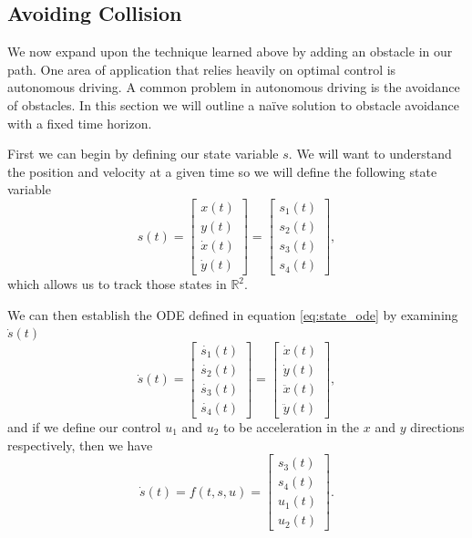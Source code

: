 \subsection*{Avoiding Collision}
We now expand upon the technique learned above by adding an obstacle in our path.
One area of application that relies heavily on optimal control is autonomous driving.
A common problem in autonomous driving is the avoidance of obstacles.
In this section we will outline a naïve solution to obstacle avoidance with a fixed time horizon.

First we can begin by defining our state variable $s$.
We will want to understand the position and velocity at a given time so we will define the following state variable
\begin{equation}\label{eq:ex-state}
    s(t) = \begin{bmatrix} x(t) \\ y(t) \\ \dot{x}(t) \\ \dot{y}(t) \end{bmatrix} = \begin{bmatrix} s_1(t) \\ s_2(t) \\ s_3(t) \\ s_4(t) \end{bmatrix},
\end{equation}
which allows us to track those states in $\mathbb{R}^2$.

We can then establish the ODE defined in equation \ref{eq:state_ode} by examining $\dot{s}(t)$
\begin{equation*}
    \dot{s}(t) = \begin{bmatrix} \dot{s_1}(t) \\ \dot{s_2}(t) \\ \dot{s_3}(t) \\ \dot{s_4}(t) \end{bmatrix} = \begin{bmatrix} \dot{x}(t) \\ \dot{y}(t) \\ \ddot{x}(t) \\ \ddot{y}(t) \end{bmatrix},
\end{equation*}
and if we define our control $u_1$ and $u_2$ to be acceleration in the $x$ and $y$ directions respectively, then we have
\begin{equation}\label{eq:ex-state-ode}
    \dot{s}(t) = f(t,s,u) = \begin{bmatrix} s_3(t) \\ s_4(t) \\ u_1(t) \\ u_2(t) \end{bmatrix}.
\end{equation}

